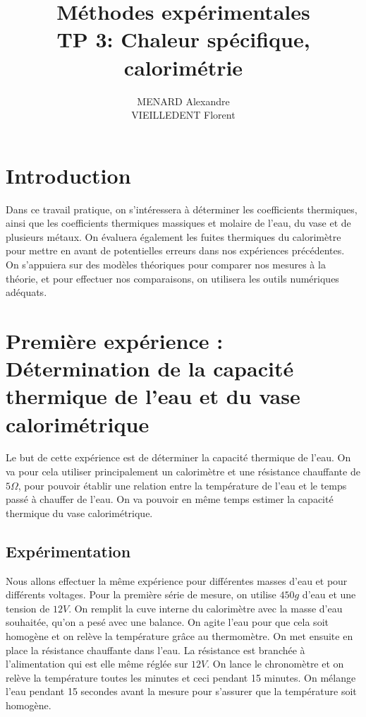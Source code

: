 \documentclass[12pt]{article}
\title{\textbf{Méthodes expérimentales} \\ TP 3: Chaleur spécifique, calorimétrie}
\author{MENARD Alexandre \\ VIEILLEDENT Florent}
\begin{document}
\maketitle

\section*{Introduction}
Dans ce travail pratique, on s'intéressera à déterminer les coefficients thermiques, ainsi que les coefficients thermiques
massiques et molaire de l'eau, du vase et de plusieurs métaux. On évaluera également les fuites thermiques du calorimètre pour mettre
en avant de potentielles erreurs dans nos expériences précédentes. \\
On s'appuiera sur des modèles théoriques pour comparer nos mesures à la théorie, et pour effectuer nos comparaisons, on utilisera
les outils numériques adéquats.


\newpage

\section{Première expérience : Détermination de la capacité thermique de l'eau et du vase calorimétrique}

Le but de cette expérience est de déterminer la capacité thermique de l'eau. On va pour cela utiliser principalement un calorimètre et une résistance chauffante de $5 \Omega$, pour pouvoir établir une relation entre la température de l'eau et le temps passé à chauffer de l'eau. On va pouvoir en même temps estimer la capacité thermique du vase calorimétrique. 

\subsection{Expérimentation}

Nous allons effectuer la même expérience pour différentes masses d'eau et pour différents voltages. Pour la première série de mesure, on utilise $450g$ d'eau et une tension de $12V$. On remplit la cuve interne du calorimètre avec la masse d'eau souhaitée, qu'on a pesé avec une balance. On agite l'eau pour que cela soit homogène et on relève la température grâce au thermomètre. On met ensuite en place la résistance chauffante dans l'eau. La résistance est branchée à l'alimentation qui est elle même réglée sur $12V$. On lance le chronomètre et on relève la température toutes les minutes et ceci pendant 15 minutes. On mélange l'eau pendant 15 secondes avant la mesure pour s'assurer que la température soit homogène. 
\end{document}
